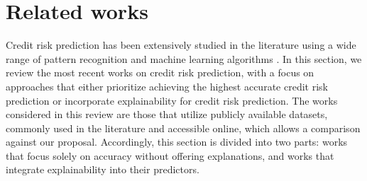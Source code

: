 \section{Related works}\label{sec:relatedworks}
    Credit risk prediction has been extensively studied in the literature using a wide range of pattern recognition and machine learning algorithms \cite{gasmi2025features, bai2025improved, dougan2025credit, aruleba2025improved, yao2025novel, liang2025application, lu2025efficient, yu2025hybrid, nguyen2025comparative, zou2025variable, zeng2025nexus, hartomo2025novel, ali2025explainable, zandi2025attention, sun2025enhancing, zhou2025enhancing, baisholan2025fraudx, oliveira2025advancing, lin2025deep, sundaravadivel2025optimizing, kandi2025evaluating, wang2025two}. %
    In this section, we review the most recent works on credit risk prediction, with a focus on approaches that either prioritize achieving the highest accurate credit risk prediction or incorporate explainability for credit risk prediction. The works considered in this review are those that utilize publicly available datasets, commonly used in the literature and accessible online, which allows a comparison against our proposal. Accordingly, this section is divided into two parts: works that focus solely on accuracy without offering explanations, and works that integrate explainability into their predictors.
    
    
    
    